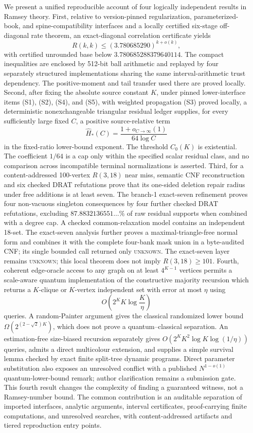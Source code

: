 We present a unified reproducible account of four logically independent
results in Ramsey theory.  First, relative to version-pinned regularization,
parameterized-book, and spine-compatibility interfaces and a locally certified
six-stage off-diagonal rate theorem, an exact-diagonal correlation certificate yields
\[
 R(k,k)\le (3.780685290)^{k+o(k)},
\]
with certified unrounded base below $3.780685288379640114$.  The compact
inequalities are enclosed by 512-bit ball arithmetic and replayed by four
separately structured implementations sharing the same interval-arithmetic
trust dependency.  The positive-moment and tail transfer used there are
proved locally.  Second, after fixing the absolute source constant \(K\),
under pinned lower-interface items (S1), (S2), (S4), and (S5), with
weighted propagation (S3) proved locally, a deterministic nonexchangeable
triangular residual ledger supplies, for every sufficiently large fixed
$C$, a positive source-relative term
\[
 \widehat H_*(C)=\frac{1+o_{C\to\infty}(1)}{64\log C}
\]
in the fixed-ratio lower-bound exponent.  The threshold \(C_0(K)\) is
existential.  The coefficient \(1/64\) is a cap only within the specified
scalar residual class, and no comparison across incompatible terminal
normalizations is asserted.  Third, for a content-addressed 100-vertex
$R(3,18)$ near miss,
semantic CNF reconstruction and six checked DRAT refutations prove that its
one-sided deletion repair radius under free additions is at least seven.  The
branch-1 exact-seven refinement proves four non-vacuous singleton
consequences by four further checked DRAT refutations, excluding
$87.8832136551\ldots\%$ of raw residual supports when combined with a degree
cap.  A checked common-relaxation model contains an independent 18-set.  The
exact-seven analysis further proves a maximal-triangle-free normal form and
combines it with the complete four-bank mask union in a byte-audited CNF; its
single bounded call returned only \textsc{unknown}.  The
exact-seven layer remains \textsc{unknown}; this local theorem does not imply
$R(3,18)\ge101$.  Fourth, coherent edge-oracle access to any graph on at
least $4^{K-1}$ vertices permits a scale-aware quantum implementation of the
constructive majority recursion which returns a $K$-clique or $K$-vertex
independent set with error at most $\eta$ using
\[
 O\!\left(2^K K\log\frac K\eta\right)
\]
queries.  A random-Painter argument gives the classical randomized lower
bound $\Omega(2^{(2-\sqrt2)K})$, which does not prove a quantum--classical
separation.  An estimation-free size-biased recursion separately gives
$O(2^K K^2\log K\log(1/\eta))$ queries, admits a direct multicolour
extension, and supplies a simple survival lemma checked by exact finite
split-tree dynamic programs.  Direct parameter substitution also exposes an unresolved
conflict with a published $N^{1-o(1)}$ quantum-lower-bound remark; author
clarification remains a submission gate.  This fourth result changes the
complexity of finding a guaranteed witness, not a Ramsey-number bound.  The
common contribution is an auditable separation of
imported interfaces, analytic arguments, interval certificates,
proof-carrying finite computations, and unresolved searches, with
content-addressed artifacts and tiered reproduction entry points.
